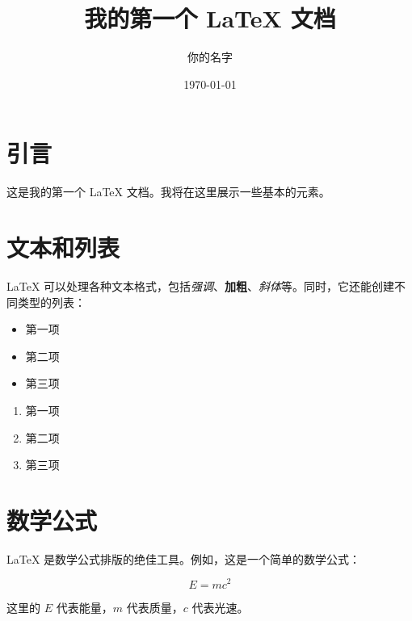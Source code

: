\documentclass[UTF8]{ctexart}
\title{我的第一个 LaTeX 文档}
\author{你的名字}
\date{\today} %
\begin{document}
\maketitle

\section{引言}
这是我的第一个 LaTeX 文档。我将在这里展示一些基本的元素。

\section{文本和列表}
LaTeX 可以处理各种文本格式，包括\emph{强调}、\textbf{加粗}、\textit{斜体}等。同时，它还能创建不同类型的列表：

\begin{itemize}
    \item 第一项
    \item 第二项
    \item 第三项
\end{itemize}

\begin{enumerate}
    \item 第一项
    \item 第二项
    \item 第三项
\end{enumerate}

\section{数学公式}
LaTeX 是数学公式排版的绝佳工具。例如，这是一个简单的数学公式：

\begin{equation}
    E = mc^2
\end{equation}

这里的 $E$ 代表能量，$m$ 代表质量，$c$ 代表光速。
\end{document}
